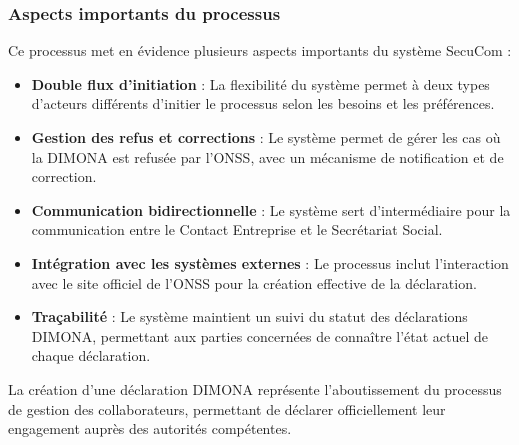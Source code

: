 \documentclass[12pt,a4paper]{report}
\begin{document}
\subsubsection{Aspects importants du processus}

Ce processus met en évidence plusieurs aspects importants du système SecuCom :

\begin{itemize}
  \item \textbf{Double flux d'initiation} : La flexibilité du système permet à deux types d'acteurs différents d'initier le processus selon les besoins et les préférences.
  \item \textbf{Gestion des refus et corrections} : Le système permet de gérer les cas où la DIMONA est refusée par l'ONSS, avec un mécanisme de notification et de correction.
  \item \textbf{Communication bidirectionnelle} : Le système sert d'intermédiaire pour la communication entre le Contact Entreprise et le Secrétariat Social.
  \item \textbf{Intégration avec les systèmes externes} : Le processus inclut l'interaction avec le site officiel de l'ONSS pour la création effective de la déclaration.
  \item \textbf{Traçabilité} : Le système maintient un suivi du statut des déclarations DIMONA, permettant aux parties concernées de connaître l'état actuel de chaque déclaration.
\end{itemize}

La création d'une déclaration DIMONA représente l'aboutissement du processus de gestion des collaborateurs, permettant de déclarer officiellement leur engagement auprès des autorités compétentes.


\end{document}
